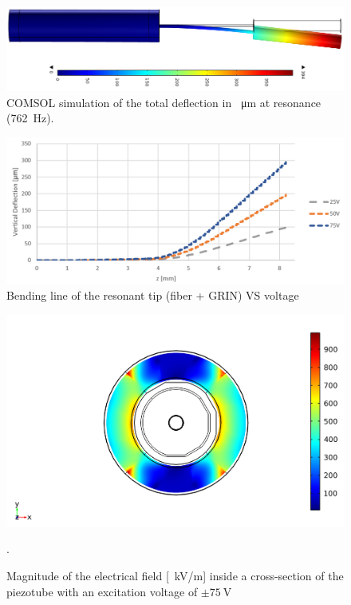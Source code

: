 \begin{figure}[h!]\centering
      \includegraphics[width=10 cm]{figures/30_DesignSimulation/Mechanical/deflectionc.png}
      \caption{COMSOL simulation of the total deflection in \SI{}{\micro\meter}  at resonance (\SI{762}{\hertz}).}
      \label{fig:defle}
\end{figure}

\begin{figure}[h!]\centering
      \includegraphics[width=10 cm]{figures/30_DesignSimulation/Mechanical/vsweep.png}
      \caption{Bending line of the resonant tip (fiber + GRIN) VS voltage}
      \label{fig:vsweep}
\end{figure}

\begin{figure}[h!]\centering
      \includegraphics[width=10 cm]{figures/30_DesignSimulation/Mechanical/field.png}
      \caption{Magnitude of the electrical field [\SI{}{\kilo \volt / \meter}] inside a cross-section of the piezotube with an excitation voltage of $\pm \SI{75}{\volt}$}.
      \label{fig:field}
\end{figure}


\newpage
